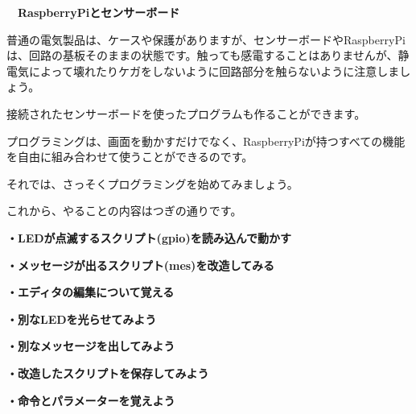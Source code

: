\documentclass[a4paper,dvipdfmx]{jarticle}
\newcommand\textstyleqwerty[1]{#1}
\begin{document}
\bigskip


\bigskip


\bigskip


\bigskip


\bigskip


\bigskip


\bigskip


\bigskip


\bigskip


\bigskip


\bigskip


\bigskip


\bigskip


\bigskip


\bigskip

\textstyleqwerty{\textbf{　RaspberryPiとセンサーボード}}


\bigskip


\bigskip


\bigskip


\bigskip

普通の電気製品は、ケースや保護がありますが、センサーボードやRaspberryPiは、回路の基板そのままの状態です。触っても感電することはありませんが、静電気によって壊れたりケガをしないように回路部分を触らないように注意しましょう。


\bigskip

接続されたセンサーボードを使ったプログラムも作ることができます。

プログラミングは、画面を動かすだけでなく、RaspberryPiが持つすべての機能を自由に組み合わせて使うことができるのです。


\bigskip

それでは、さっそくプログラミングを始めてみましょう。

これから、やることの内容はつぎの通りです。


\bigskip

{\bfseries
・LEDが点滅するスクリプト(gpio)を読み込んで動かす}

{\bfseries
・メッセージが出るスクリプト(mes)を改造してみる}

{\bfseries
・エディタの編集について覚える}

{\bfseries
・別なLEDを光らせてみよう}

{\bfseries
・別なメッセージを出してみよう}

{\bfseries
・改造したスクリプトを保存してみよう}

{\bfseries
・命令とパラメーターを覚えよう}


\bigskip
\end{document}
